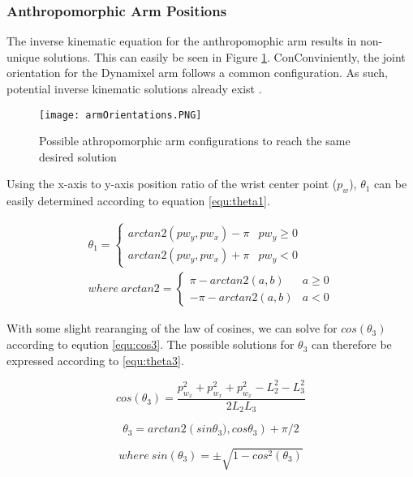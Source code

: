 \documentclass[10pt,journal]{IEEEtran}
\begin{document}
\subsubsection{Anthropomorphic Arm Positions}
The inverse kinematic equation for the anthropomophic arm results in non-unique solutions. This can easily be seen in Figure \ref{fig:armOrientations}. ConConviniently, the joint orientation for the Dynamixel arm follows a common configuration. As such, potential inverse kinematic solutions already exist \cite{siciliano2009robotics}.

\begin{figure}[ht!]
\centering
\texttt{[image: armOrientations.PNG]}
\caption{Possible athropomorphic arm configurations to reach the same desired solution}
\label{fig:armOrientations}
\end{figure}

Using the x-axis to y-axis position ratio of the wrist center point ($p_w$), $\theta_1$ can be easily determined according to equation \ref{equ:theta1}. 

\begin{align} \label{equ:theta1}
	\theta_1 = 
		\begin{cases}
			arctan2(pw_y,pw_x) - \pi & pw_y \geq 0  \\
			arctan2(pw_y,pw_x) + \pi & pw_y < 0 
		\end{cases} 
	\\
	where\ arctan2 = 
		\begin{cases}
			\pi - arctan2(a,b) & a \geq 0 \\
			-\pi - arctan2(a,b) & a < 0
		\end{cases} 
\end{align}

With some slight rearanging of the law of cosines, we can solve for $cos(\theta_3)$ according to eqution \ref{equ:cos3}. The possible solutions for $\theta_3$ can therefore be expressed according to \ref{equ:theta3}.

\begin{equation}\label{equ:cos3}
	cos(\theta_3) = \frac{p^2_{w_x} + p^2_{w_x} + p^2_{w_x} - L_2^2 - L_3^2}{2 L_2 L_3}
\end{equation}

\begin{equation}\label{equ:theta3}
	\theta_3 = arctan2(sin{\theta_3),cos{\theta_3}}) + \pi/2
\end{equation}

\begin{equation*}
	where\ sin(\theta_3) = \pm\sqrt{1-cos^2(\theta_3)}
\end{equation*}
\end{document}

